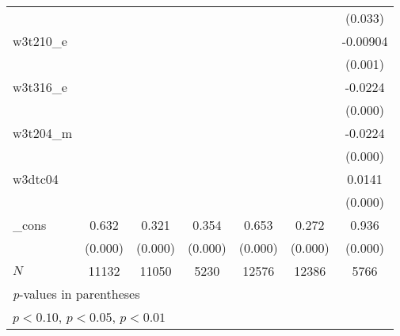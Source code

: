 {\begin{tabular}{l*{6}{c}}
            &                     &                     &                     &                     &                     &     (0.033)         \\
[1em]
w3t210\_e    &                     &                     &                     &                     &                     &    -0.00904\sym{***}\\
            &                     &                     &                     &                     &                     &     (0.001)         \\
[1em]
w3t316\_e    &                     &                     &                     &                     &                     &     -0.0224\sym{***}\\
            &                     &                     &                     &                     &                     &     (0.000)         \\
[1em]
w3t204\_m    &                     &                     &                     &                     &                     &     -0.0224\sym{***}\\
            &                     &                     &                     &                     &                     &     (0.000)         \\
[1em]
w3dtc04     &                     &                     &                     &                     &                     &      0.0141\sym{***}\\
            &                     &                     &                     &                     &                     &     (0.000)         \\
[1em]
\_cons      &       0.632\sym{***}&       0.321\sym{***}&       0.354\sym{***}&       0.653\sym{***}&       0.272\sym{***}&       0.936\sym{***}\\
            &     (0.000)         &     (0.000)         &     (0.000)         &     (0.000)         &     (0.000)         &     (0.000)         \\
\hline
\(N\)       &       11132         &       11050         &        5230         &       12576         &       12386         &        5766         \\
\hline\hline
\multicolumn{7}{l}{\footnotesize \textit{p}-values in parentheses}\\
\multicolumn{7}{l}{\footnotesize \sym{*} \(p<0.10\), \sym{**} \(p<0.05\), \sym{***} \(p<0.01\)}\\
\end{tabular}
}
